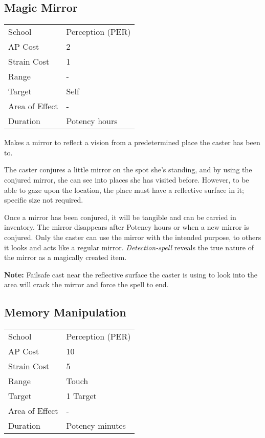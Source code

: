 \documentclass[11pt,a4paper,twocolumn]{book}
\begin{document}
\subsection*{Magic Mirror}
{
	\begin{tabu} to 75mm{| X[l,4] | X[l,7] |}
		\hline
		School 			& Perception (PER) 		\\
		AP Cost	      	& 2 					\\
		Strain Cost     & 1 					\\
		Range     		& -						\\
		Target      	& Self					\\
		Area of Effect  & -  	 				\\
		Duration     	& Potency hours			\\ \hline
	\end{tabu}
	
}

\medskip

Makes a mirror to reflect a vision from a predetermined place the caster has been to.

The caster conjures a little mirror on the spot she's standing, and by using the conjured mirror, she can see into places she has visited before. However, to be able to gaze upon the location, the place must have a reflective surface in it; specific size not required.

Once a mirror has been conjured, it will be tangible and can be carried in inventory. The mirror disappears after Potency hours or when a new mirror is conjured. Only the caster can use the mirror with the intended purpose, to others it looks and acts like a regular mirror. \textit{Detection-spell} reveals the true nature of the mirror as a magically created item.

\textbf{Note:} Failsafe cast near the reflective surface the caster is using to look into the area will crack the mirror and force the spell to end.

\vfill

\subsection*{Memory Manipulation}
{
	\begin{tabu} to 75mm{| X[l,4] | X[l,7] |}
		\hline
		School 			& Perception (PER) 		\\
		AP Cost	      	& 10 					\\
		Strain Cost     & 5 					\\
		Range     		& Touch					\\
		Target      	& 1 Target				\\
		Area of Effect  & -  	 				\\
		Duration     	& Potency minutes			\\ \hline
	\end{tabu}
	
}
\end{document}

